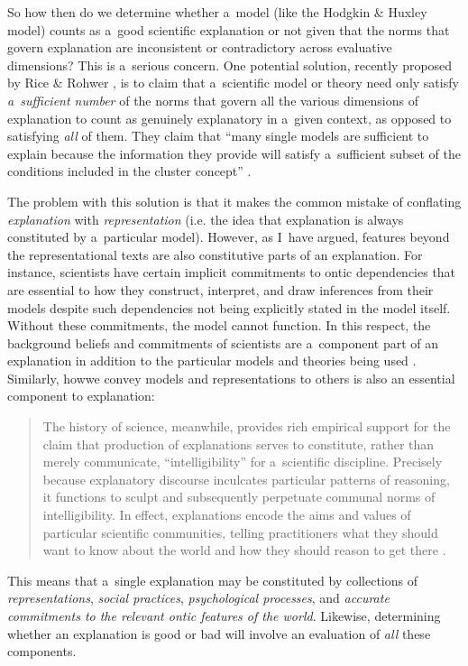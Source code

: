 So how then do we determine whether a~model (like the Hodgkin \& Huxley model) counts as a~good scientific explanation or not given that the norms that govern explanation are inconsistent or contradictory across evaluative dimensions? This is a~serious concern. One potential solution, recently proposed by Rice \& Rohwer
\parencite*[][]{rice_how_2020}, %
 is to claim that a~scientific model or theory need only satisfy \textit{a~sufficient number} of the norms that govern all the various dimensions of explanation to count as genuinely explanatory in a~given context, as opposed to satisfying \textit{all} of them. They claim that ``many single models are sufficient to explain because the information they provide will satisfy a~sufficient subset of the conditions included in the cluster concept'' 
\parencite[][p.1043]{rice_how_2020}.%


The problem with this solution is that it makes the common mistake of conflating \textit{explanation} with \textit{representation} (i.e. the idea that explanation is always constituted by a~particular model). However, as I~have argued, features beyond the representational texts are also constitutive parts of an explanation. For instance, scientists have certain implicit commitments to ontic dependencies that are essential to how they construct, interpret, and draw inferences from their models despite such dependencies not being explicitly stated in the model itself. Without these commitments, the model cannot function. In this respect, the background beliefs and commitments of scientists are a~component part of an explanation in addition to the particular models and theories being used
\parencites[see:][]{bokulich_representing_2018}[][]{hochstein_how_2019}. %
 Similarly, howwe convey models and representations to others is also an essential component to explanation:

\begin{quotation}
The history of science, meanwhile, provides rich empirical support for the claim that production of explanations serves to constitute, rather than merely communicate, ``intelligibility'' for a~scientific discipline. Precisely because explanatory discourse inculcates particular patterns of reasoning, it functions to sculpt and subsequently perpetuate communal norms of intelligibility. In effect, explanations encode the aims and values of particular scientific communities, telling practitioners what they should want to know about the world and how they should reason to get there
\parencite[][p.81]{woody_re-orienting_2015}.%


\end{quotation}
This means that a~single explanation may be constituted by collections of \textit{representations}, \textit{social practices}, \textit{psychological processes}, and \textit{accurate commitments to the relevant ontic features of the world}. Likewise, determining whether an explanation is good or bad will involve an evaluation of \textit{all} these components.

